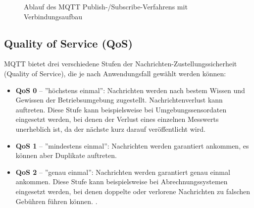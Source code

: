 \begin{figure}[H]
	\centering
	\caption{Ablauf des MQTT Publish-/Subscribe-Verfahrens mit Verbindungsaufbau}
	\label{fig:mqtt_pubsub}
\end{figure}

\subsection*{Quality of Service (QoS)}

MQTT bietet drei verschiedene Stufen der Nachrichten-Zustellungssicherheit (Quality of Service), die je nach Anwendungsfall gewählt werden können:

\begin{itemize}
	\item \textbf{QoS 0} – ''höchstens einmal'': Nachrichten werden nach bestem Wissen und Gewissen der Betriebsumgebung zugestellt. Nachrichtenverlust kann auftreten. Diese Stufe kann beispielsweise bei Umgebungssensordaten eingesetzt werden, bei denen der Verlust eines einzelnen Messwerts unerheblich ist, da der nächste kurz darauf veröffentlicht wird.
	\item \textbf{QoS 1} – ''mindestens einmal'': Nachrichten werden garantiert ankommen, es können aber Duplikate auftreten.
	\item \textbf{QoS 2} – ''genau einmal'': Nachrichten werden garantiert genau einmal ankommen. Diese Stufe kann beispielsweise bei Abrechnungssystemen eingesetzt werden, bei denen doppelte oder verlorene Nachrichten zu falschen Gebühren führen können. \cite[Abschnitt 4.3]{oasis_mqtt_spec}.
\end{itemize}

